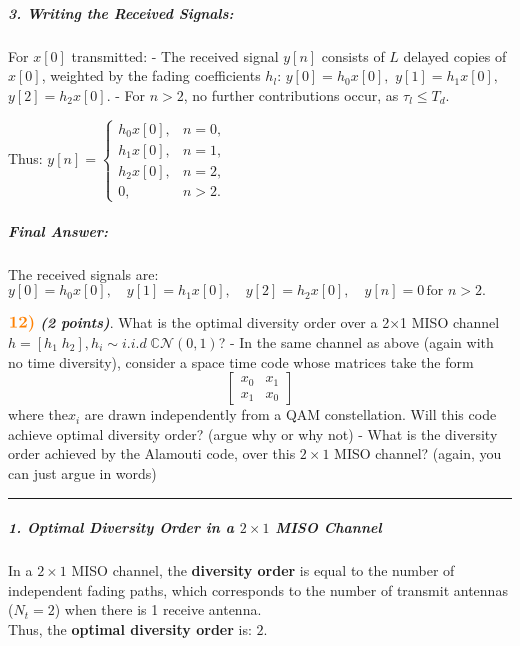 \documentclass[11pt]{article}
\begin{document}
\subparagraph{\texorpdfstring{\textbf{3. Writing the Received
Signals}:}{3. Writing the Received Signals:}}\label{writing-the-received-signals}

For \(x[0]\) transmitted: - The received signal \(y[n]\) consists of
\(L\) delayed copies of \(x[0]\), weighted by the fading coefficients
\(h_l\): \(y[0] = h_0 x[0],\) \(y[1] = h_1 x[0],\) \(y[2] = h_2 x[0].\)
- For \(n > 2\), no further contributions occur, as \(\tau_l \leq T_d\).

Thus:
\(y[n] = \boxed{ \begin{cases} h_0 x[0], & n = 0, \\ h_1 x[0], & n = 1, \\ h_2 x[0], & n = 2, \\ 0, & n > 2. \end{cases}}\)

\subparagraph{\texorpdfstring{\textbf{Final
Answer}:}{Final Answer:}}\label{final-answer}

The received signals are:
\(y[0] = h_0 x[0], \quad y[1] = h_1 x[0], \quad y[2] = h_2 x[0], \quad y[n] = 0 \, \text{for } n > 2.\)

    \(\color{orange} \large \textbf{12)}\) \textbf{\emph{(2 points)}}. What
is the optimal diversity order over a 2×1 MISO channel
\(h = [h_1 \; h_2], h_i \sim i.i.d \; \mathbb{C}\mathcal{N}(0,1)\)? - In
the same channel as above (again with no time diversity), consider a
space time code whose matrices take the form \[\begin{bmatrix}
x_0 & x_1 \\
x_1 & x_0
\end{bmatrix}
\]where the\(x_i\) are drawn independently from a QAM constellation.
Will this code achieve optimal diversity order? (argue why or why not) -
What is the diversity order achieved by the Alamouti code, over this
\(2 \times 1\) MISO channel? (again, you can just argue in words)

    \begin{center}\rule{0.5\linewidth}{0.5pt}\end{center}

\subparagraph{\texorpdfstring{\textbf{1. Optimal Diversity Order in a
\(2 \times 1\) MISO
Channel}}{1. Optimal Diversity Order in a 2 \textbackslash times 1 MISO Channel}}\label{optimal-diversity-order-in-a-2-times-1-miso-channel}

In a \(2 \times 1\) MISO channel, the \textbf{diversity order} is equal
to the number of independent fading paths, which corresponds to the
number of transmit antennas (\(N_t = 2\)) when there is 1 receive
antenna.\\
Thus, the \textbf{optimal diversity order} is: \(\boxed{2}.\)
\end{document}
